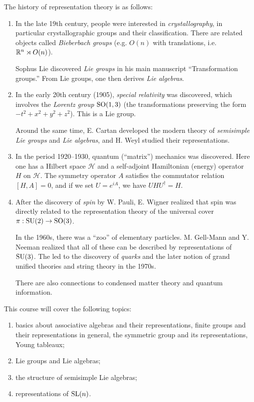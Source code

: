 The history of representation theory is as
follows:
\begin{enumerate}
    \item
    In the late 19th century, people
    were interested in \emph{crystallography},
    in particular crystallographic groups
    and their classification. There are
    related objects called \emph{Bieberbach groups} (e.g. $O(n)$ with translations, i.e.
    $\mathbb{R}^n \rtimes O(n)$).

    Sophus Lie discovered \emph{Lie groups}
    in his main manuscript ``Transformation
    groups.'' From Lie groups, one then derives
    \emph{Lie algebras}.

    \item
    In the early 20th century (1905),
    \emph{special relativity} was discovered,
    which involves the \emph{Lorentz group}
    $\operatorname{SO}(1, 3)$ (the transformations preserving
    the form $-t^2 + x^2 + y^2 + z^2$).
    This is a Lie group.

    Around the same time, E. Cartan developed
  the modern theory of \emph{semisimple Lie groups} and \emph{Lie algebras}, and
    H. Weyl studied their representations.

    \item
    In the period 1920--1930, quantum (``matrix'')
    mechanics was discovered. Here
    one has a Hilbert space $\mathcal{H}$ and
    a self-adjoint Hamiltonian (energy)
    operator $H$ on $\mathcal{H}$.
    The symmetry operator $A$ satisfies
    the commutator relation
    $[H, A] = 0$, and if we set $U = e^{iA}$,
    we have $U H U^\dagger = H$.

    \item
    After the discovery of \emph{spin} by W.
    Pauli, E. Wigner realized that spin was
    directly related to the representation
    theory of the universal cover
    $\pi : \operatorname{SU}(2) \to \operatorname{SO}(3)$.

    In the 1960s, there was a ``zoo'' of
    elementary particles. M. Gell-Mann and
    Y. Neeman realized that all of these
    can be described by representations of
    $\operatorname{SU}(3)$. The led to the discovery of
    \emph{quarks} and the later
    notion of grand unified theories and
    string theory in the 1970s.

    There are also connections to condensed
    matter theory and quantum information.
\end{enumerate}

This course will cover the following topics:
\begin{enumerate}
  \item basics about associative algebras
    and their representations, finite groups
    and their representations in general,
    the symmetric group and its representations,
    Young tableaux;
  \item Lie groups and Lie algebras;
  \item the structure of semisimple Lie
    algebras;
  \item representations of $\operatorname{SL}(n)$.
\end{enumerate}


